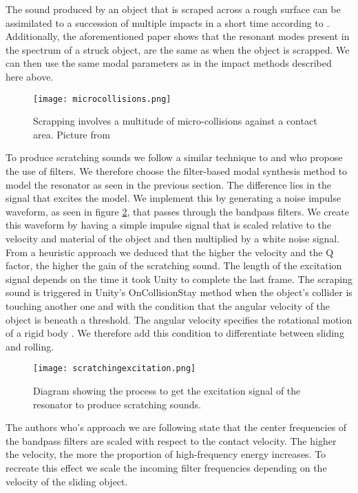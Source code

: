 The sound produced by an object that is scraped across a rough surface can be assimilated to a succession of multiple impacts in a short time according to \cite{gaver1993we}. Additionally, the aforementioned paper shows that the resonant modes present in the spectrum of a struck object, are the same as when the object is scrapped. We can then use the same modal parameters as in the impact methods described here above.

\begin{figure}[H]
  \centering
    \texttt{[image: microcollisions.png]}
      \caption{Scrapping involves a multitude of micro-collisions against a contact area. Picture from \cite{gaver1993we}}
      \label{fig:microcollisions}
\end{figure}

To produce scratching sounds we follow a similar technique to \cite{gaver1993we} and \cite{van2001foleyautomatic} who propose the use of filters. We therefore choose the filter-based modal synthesis method to model the resonator as seen in the previous section. The difference lies in the signal that excites the model. We implement this by generating a noise impulse waveform, as seen in figure \ref{fig:scratchingimpulse}, that passes through the bandpass filters. We create this waveform by having a simple impulse signal that is scaled relative to the velocity and material of the object and then multiplied by a white noise signal. From a heuristic approach we deduced that the higher the velocity and the Q factor, the higher the gain of the scratching sound. The length of the excitation signal depends on the time it took Unity\textsuperscript{\textregistered} to complete the last frame. The scraping sound is triggered in Unity\textsuperscript{\textregistered}'s OnCollisionStay method when the object's collider is touching another one and with the condition that the angular velocity of the object is beneath a threshold. The angular velocity specifies the rotational motion of a rigid body \cite{sears1964university}. We therefore add this condition to differentiate between sliding and rolling.

\begin{figure}[H]
  \centering
    \texttt{[image: scratchingexcitation.png]}
      \caption{Diagram showing the process to get the excitation signal of the resonator to produce scratching sounds.}
      \label{fig:scratchingimpulse}
\end{figure} 

The authors who's approach we are following state that the center frequencies of the bandpass filters are scaled with respect to the contact velocity. The higher the velocity, the more the proportion of high-frequency energy increases. To recreate this effect we scale the incoming filter frequencies depending on the velocity of the sliding object.

